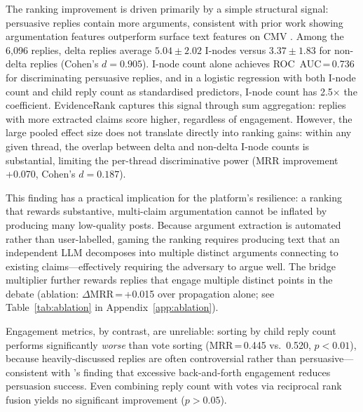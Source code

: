 The ranking improvement is driven primarily by a simple structural signal: persuasive replies contain more arguments, consistent with prior work showing argumentation features outperform surface text features on CMV \citep{wei-etal-2016-post}. Among the 6{,}096 replies, delta replies average $5.04 \pm 2.02$ I-nodes versus $3.37 \pm 1.83$ for non-delta replies (Cohen's $d = 0.905$). I-node count alone achieves ROC~AUC\,=\,0.736 for discriminating persuasive replies, and in a logistic regression with both I-node count and child reply count as standardised predictors, I-node count has 2.5$\times$ the coefficient. EvidenceRank captures this signal through sum aggregation: replies with more extracted claims score higher, regardless of engagement. However, the large pooled effect size does not translate directly into ranking gains: within any given thread, the overlap between delta and non-delta I-node counts is substantial, limiting the per-thread discriminative power (MRR improvement +0.070, Cohen's $d = 0.187$).

This finding has a practical implication for the platform's resilience: a ranking that rewards substantive, multi-claim argumentation cannot be inflated by producing many low-quality posts. Because argument extraction is automated rather than user-labelled, gaming the ranking requires producing text that an independent LLM decomposes into multiple distinct arguments connecting to existing claims---effectively requiring the adversary to argue well. The bridge multiplier further rewards replies that engage multiple distinct points in the debate (ablation: $\Delta$MRR\,=\,+0.015 over propagation alone; see Table~\ref{tab:ablation} in Appendix~\ref{app:ablation}).

Engagement metrics, by contrast, are unreliable: sorting by child reply count performs significantly \emph{worse} than vote sorting (MRR\,=\,0.445 vs.\ 0.520, $p<0.01$), because heavily-discussed replies are often controversial rather than persuasive---consistent with \citet{tan-etal-2016-winning}'s finding that excessive back-and-forth engagement reduces persuasion success. Even combining reply count with votes via reciprocal rank fusion \citep{cormack2009reciprocal} yields no significant improvement ($p>0.05$).
